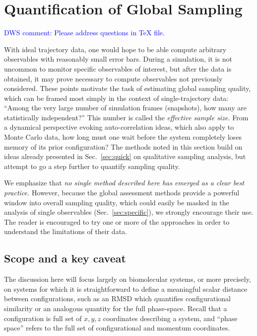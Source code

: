 \section{Quantification of Global Sampling}
\label{sec:global}

\textcolor{blue}{DWS comment: Please address questions in TeX file.}

With ideal trajectory data, one would hope to be able compute arbitrary observables with reasonably small error bars.
During a simulation, it is not uncommon to monitor specific observables of interest, but after the data is obtained, it may prove necessary to compute observables not previously considered.
These points motivate the task of estimating global sampling quality, which can be framed most simply in the context of single-trajectory data:
``Among the very large number of simulation frames (snapshots), how many are statistically independent?''
This number is called the \emph{effective sample size.}
From a dynamical perspective evoking auto-correlation ideas, which also apply to Monte Carlo data, how long must one wait before the system completely loses memory of its prior configuration?  
The methods noted in this section build on ideas already presented in Sec.\ \ref{sec:quick} on qualitative sampling analysis, but attempt to go a step further to quantify sampling quality.

We emphasize that \emph{no single method described here has emerged as a clear best practice.}
However, because the global assessment methods provide a powerful window into overall sampling quality, which could easily be masked in the analysis of single observables (Sec.\ \ref{sec:specific}), we strongly encourage their use.
The reader is encouraged to try one or more of the approaches in order to understand the limitations of their data.

\subsection{Scope and a key caveat}
The discussion here will focus largely on biomolecular systems, or more precisely, on systems for which it is straightforward to define a meaningful scalar distance between configurations, such as an RMSD which quantifies configurational similarity or an analogous quantity for the full phase-space.
Recall that a configuration is full set of $x, y, z$ coordinates describing a system, and ``phase space'' refers to the full set of configurational and momentum coordinates.

